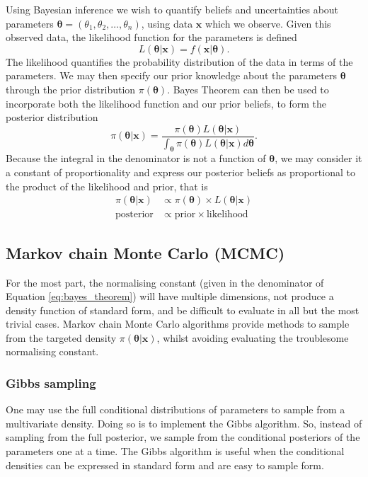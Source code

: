 Using Bayesian inference we wish to quantify beliefs and uncertainties about parameters $\bm{\theta} = (\theta_1, \theta_2,\dots,\theta_n)$, using data $\bm{x}$ which we observe. Given this observed data, the likelihood function for the parameters is defined
\[
    L(\bm{\theta}|\bm{x}) = f(\bm{x}|\bm{\theta}).
\]
The likelihood quantifies the probability distribution of the data in terms of the parameters. We may then specify our prior knowledge about the parameters $\bm{\theta}$ through the prior distribution $\pi(\bm{\theta})$. Bayes Theorem can then be used to incorporate both the likelihood function and our prior beliefs, to form the posterior distribution
\begin{equation}
\label{eq:bayes_theorem}
    \pi(\bm{\theta}|\bm{x}) = \frac{\pi({\bm{\theta}})L(\bm{\theta}|\bm{x})}{\int_{\bm{\theta}} \pi(\bm{\theta})L(\bm{\theta}|\bm{x})d\bm{\theta}}.
\end{equation}
Because the integral in the denominator is not a function of $\bm{\theta}$, we may consider it a constant of proportionality and express our posterior beliefs as proportional to the product of the likelihood and prior, that is
\begin{align*}
    \pi(\bm{\theta}|\bm{x}) &\propto \pi(\bm{\theta}) \times L(\bm{\theta}|\bm{x})\\
    \text{posterior} &\propto \text{prior} \times \text{likelihood}
\end{align*}

\subsection{Markov chain Monte Carlo (MCMC)}
\label{ssec:mcmc}

For the most part, the normalising constant (given in the denominator of Equation \eqref{eq:bayes_theorem}) will have multiple dimensions, not produce a density function of standard form, and be difficult to evaluate in all but the most trivial cases. Markov chain Monte Carlo algorithms provide methods to sample from the targeted density $\pi(\bm{\theta}|\bm{x})$, whilst avoiding evaluating the troublesome normalising constant.

\subsubsection{Gibbs sampling}
\label{sssec:gibbs_sampling}
One may use the full conditional distributions of parameters to sample from a multivariate density. Doing so is to implement the Gibbs algorithm. So, instead of sampling from the full posterior, we sample from the conditional posteriors of the parameters one at a time. The Gibbs algorithm is useful when the conditional densities can be expressed in standard form and are easy to sample form.

